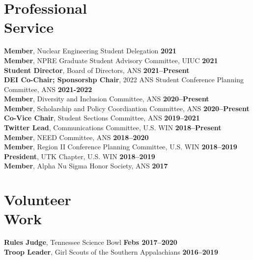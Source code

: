 \documentclass[margin,line]{resume}
\begin{document}
\begin{resume}
    \section{\mysidestyle Professional\\Service}
                \textbf{Member}, Nuclear Engineering Student Delegation \hfill \textbf{2021}\vspace{0.5mm}\\
                \textbf{Member}, NPRE Graduate Student Advisory Committee, UIUC \hfill \textbf{2021}\vspace{0.5mm}\\
                \textbf{Student Director}, Board of Directors, ANS \hfill \textbf{2021--Present}\vspace{.5mm}\\
                \textbf{DEI Co-Chair; Sponsorshp Chair}, 2022 ANS Student Conference Planning Committee, ANS \hfill 
                \textbf{2021-2022} \\
                \textbf{Member}, Diversity and Inclusion Committee, ANS  \hfill \textbf{2020--Present}\vspace{.5mm}\\%
                \textbf{Member}, Scholarship and Policy Coordiantion Committee, ANS  \hfill \textbf{2020--Present}\vspace{.5mm}\\%
                \textbf{Co-Vice Chair}, Student Sections Committee, ANS  \hfill \textbf{2019--2021}\vspace{.5mm}\\%
                \textbf{Twitter Lead}, Communications Committee, U.S. WIN  \hfill \textbf{2018--Present}\vspace{.5mm}\\%
                \textbf{Member}, NEED Committee, ANS  \hfill \textbf{2018--2020}\vspace{.5mm}\\%
                \textbf{Member}, Region II Conference Planning Committee, U.S. WIN  \hfill \textbf{2018--2019}\vspace{.5mm}\\%
                \textbf{President}, UTK Chapter, U.S. WIN  \hfill \textbf{2018--2019}\vspace{.5mm}\\%
                \textbf{Member}, Alpha Nu Sigma Honor Society, ANS \hfill \textbf{2017}\vspace{.5mm}%
    
    \section{\mysidestyle Volunteer\\Work}
                \textbf{Rules Judge}, Tennessee Science Bowl \hfill \textbf{Febs 2017--2020}\\
                \textbf{Troop Leader}, Girl Scouts of the Southern Appalachians \hfill \textbf{2016--2019}\vspace{.5mm}\\%
                

\end{resume}
\end{document}
